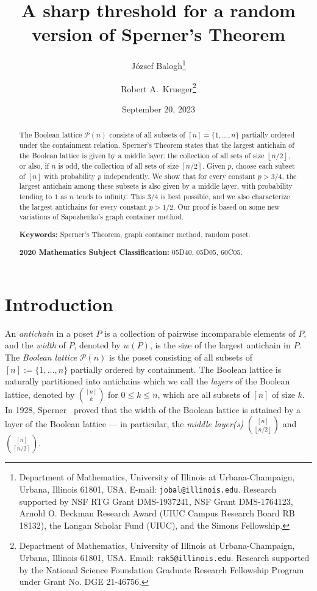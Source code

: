 \documentclass[12pt]{article}
\title{A sharp threshold for a random version of Sperner's Theorem}
\author{J\'ozsef Balogh\footnote{Department of Mathematics, University of Illinois at Urbana-Champaign, Urbana, Illinois 61801, USA. E-mail: \texttt{jobal@illinois.edu}. Research supported by NSF RTG Grant DMS-1937241, NSF Grant DMS-1764123, Arnold O. Beckman Research Award (UIUC Campus Research Board RB 18132), the Langan Scholar Fund (UIUC), and the Simons Fellowship.} \and Robert A.\ Krueger\footnote{Department of Mathematics, University of Illinois at Urbana-Champaign, Urbana, Illinois 61801, USA. Email: \texttt{rak5@illinois.edu}. Research supported by the National Science Foundation Graduate Research Fellowship Program under Grant No. DGE 21-46756.}}
\date{September 20, 2023}
\renewcommand{\P}{\mathcal{P}}
\newcommand{\floor}[1]{\left\lfloor#1\right\rfloor}
\newcommand{\ceil}[1]{\left\lceil#1\right\rceil}
\begin{document}
\maketitle

\begin{abstract}
The Boolean lattice $\mathcal{P}(n)$ consists of all subsets of $[n] = \{1,\dots, n\}$ partially ordered under the containment relation. Sperner's Theorem states that the largest antichain of the Boolean lattice is given by a middle layer: the collection of all sets of size $\floor{n/2}$, or also, if $n$ is odd, the collection of all sets of size $\ceil{n/2}$. Given $p$, choose each subset of $[n]$ with probability $p$ independently. We show that for every constant $p>3/4$, the largest antichain among these subsets is also given by a middle layer, with probability tending to $1$ as $n$ tends to infinity. This $3/4$ is best possible, and we also characterize the largest antichains for every constant $p>1/2$. Our proof is based on some new variations of Sapozhenko's graph container method.
\medskip

\noindent\textbf{Keywords:} Sperner's Theorem, graph container method, random poset.

\noindent\textbf{2020 Mathematics Subject Classification:} 05D40, 05D05, 60C05.
\end{abstract}

\section{Introduction}\label{sec::intro}

An \emph{antichain} in a poset $P$ is a collection of pairwise incomparable elements of $P$, and the \emph{width} of $P$, denoted by $w(P)$, is the size of the largest antichain in $P$. The \emph{Boolean lattice} $\P(n)$ is the poset consisting of all subsets of $[n] := \{1,\dots, n\}$ partially ordered by containment. The Boolean lattice is naturally partitioned into antichains which we call the \emph{layers} of the Boolean lattice, denoted by $\binom{[n]}{k}$ for $0 \leq k \leq n$, which are all subsets of $[n]$ of size $k$. In 1928, Sperner~\cite{Sper} proved that the width of the Boolean lattice is attained by a layer of the Boolean lattice --- in particular, the \emph{middle layer(s)} $\binom{[n]}{\floor{n/2}}$ and $\binom{[n]}{\ceil{n/2}}$. 
\end{document}
